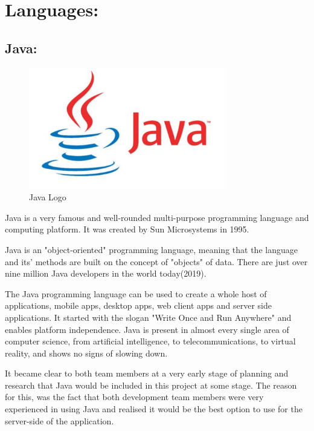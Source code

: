  

\section{Languages:}
\label{sec:TechnologyReviewLanguages}
\subsection{Java:}
\label{sec:TechnologyReviewJava}

\begin{figure}[H]
    \centering
    \includegraphics[width=\textwidth, height=150pt]{img/JavaLogo.PNG}
    \caption{Java Logo}
    \label{fig:my_label}
\end{figure}

Java is a very famous and well-rounded multi-purpose programming language and computing platform. It was created by Sun Microsystems in 1995. 

Java is an "object-oriented" programming language, meaning that the language and its' methods are built on the concept of "objects" of data. There are just over nine million Java developers in the world today(2019). 

\bigskip

The Java programming language can be used to create a whole host of applications, mobile apps, desktop apps, web client apps and server side applications. It started with the slogan "Write Once and Run Anywhere" and enables platform independence. Java is present in almost every single area of computer science, from artificial intelligence, to telecommunications, to virtual reality, and shows no signs of slowing down. 

\bigskip

It became clear to both team members at a very early stage of planning and research that Java would be included in this project at some stage. The reason for this, was the fact that both development team members were very experienced in using Java and realised it would be the best option to use for the server-side of the application. 

